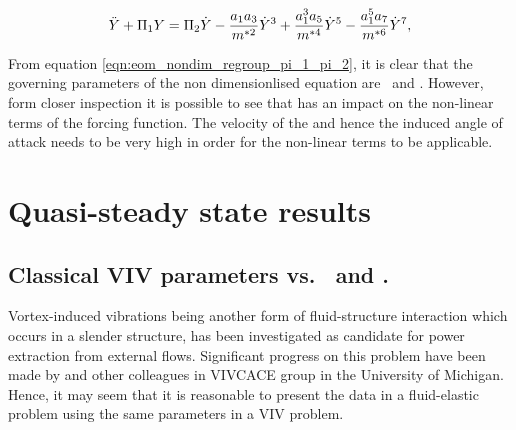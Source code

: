   \begin{equation}
  \label{eqn:eom_nondim_regroup_pi_1_pi_2}
  \ddot{Y} + \Pi_1 Y = \Pi_2 \dot{Y} - \frac{a_1a_3}{m^{*2}}\dot{Y}^3 + \frac{a_1^3a_5}{m^{*4}}\dot{Y}^5 - \frac{a_1^5a_7}{m^{*6}}\dot{Y}^7,
  \end{equation} 
  
From equation \ref{eqn:eom_nondim_regroup_pi_1_pi_2}, it is clear that the governing parameters of the non dimensionlised equation are \massstiff \ \massdamp and \mstar. However, form closer inspection it is possible to see that \mstar has an impact on the non-linear terms of the forcing function. The velocity of the and hence the induced angle of attack needs to be very high in order for the non-linear terms to be applicable. 

\section{Quasi-steady state results}
\label{sec:qss_results} 

\subsection{Classical VIV parameters vs. \massstiff \ and \massdamp.}
\label{subsec:compare_data}


Vortex-induced vibrations being another form of fluid-structure interaction which occurs in a slender structure, has been investigated as candidate for power extraction from external flows. Significant progress on this problem have been made by \cite{Bernitsas2008a-concept,Bernitsas2009,Raghavan2010a,Lee2011b} and other colleagues in VIVCACE group in the University of Michigan. Hence, it may seem that it is reasonable to present the data in a fluid-elastic problem using the same parameters in a VIV problem.



